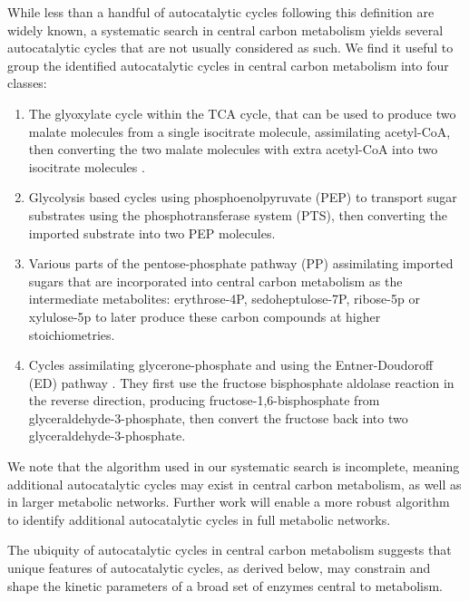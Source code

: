  
While less than a handful of autocatalytic cycles following this definition are widely known, a systematic search in central carbon metabolism yields several autocatalytic cycles that are not usually considered as such.
We find it useful to group the identified autocatalytic cycles in central carbon metabolism into four classes:
\begin{enumerate}
    \item The glyoxylate cycle within the TCA cycle, that can be used to produce two malate molecules from a single isocitrate molecule, assimilating acetyl-CoA, then converting the two malate molecules with extra acetyl-CoA into two isocitrate molecules \cite{Kornberg1966-lh}.
    \item Glycolysis based cycles using phosphoenolpyruvate (PEP) to transport sugar substrates using the phosphotransferase system (PTS), then converting the imported substrate into two PEP molecules.
    \item Various parts of the pentose-phosphate pathway (PP) assimilating imported sugars that are incorporated into central carbon metabolism as the intermediate metabolites: erythrose-4P, sedoheptulose-7P, ribose-5p or xylulose-5p to later produce these carbon compounds at higher stoichiometries.
    \item Cycles assimilating glycerone-phosphate and using the Entner-Doudoroff (ED) pathway \cite{Entner1952-xs}.
        They first use the fructose bisphosphate aldolase reaction in the reverse direction, producing fructose-1,6-bisphosphate from glyceraldehyde-3-phosphate, then convert the fructose back into two glyceraldehyde-3-phosphate.
\end{enumerate}

We note that the algorithm used in our systematic search is incomplete, meaning additional autocatalytic cycles may exist in central carbon metabolism, as well as in larger metabolic networks.
Further work will enable a more robust algorithm to identify additional autocatalytic cycles in full metabolic networks.

The ubiquity of autocatalytic cycles in central carbon metabolism suggests that unique features of autocatalytic cycles, as derived below, may constrain and shape the kinetic parameters of a broad set of enzymes central to metabolism.

